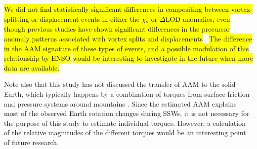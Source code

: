 \documentclass[draft,jgrga]{agutex}
\begin{document}
\begin{article}
\hl{We did not find statistically significant differences in compositing between vortex-splitting or displacement events in either the $\chi_2$ or $\Delta$LOD anomalies, even though previous studies have shown significant differences in the precursor  anomaly patterns associated with vortex splits and displacements} \citep{martiusetal2009, Mitchell2012}.  
\hl{The difference in the AAM signature of these types of events, and a possible modulation of this relationship by ENSO} \citep{Barriopedro2014} \hl{would be interesting to investigate in the future when more data are available.}

Note also that this study has not discussed the transfer of AAM to the solid Earth, which typically happens by a combination of torques from surface friction and  {pressure systems around} mountains \citep{Egger2007}. 
Since the estimated AAM explains most of the observed Earth rotation changes during SSWs, it is not necessary for the purpose of this study to estimate individual torques.  
However, a calculation of the relative magnitudes of the different torques would be an interesting point of future research.  


% 




%
%
%
%
%


\end{article}
\end{document}
